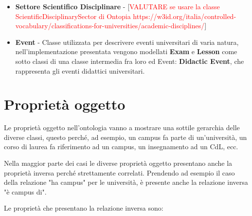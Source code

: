 \begin{itemize}
    \item \textbf{Settore Scientifico Disciplinare} - [\textcolor{red}{VALUTARE se usare la classe ScientificDisciplinarySector di Ontopia https://w3id.org/italia/controlled-vocabulary/classifications-for-universities/academic-disciplines/}]

    \item \textbf{Event} - Classe utilizzata per descrivere eventi universitari di varia natura, nell'implementazione presentata vengono modellati \textbf{Exam} e \textbf{Lesson} come sotto classi di una classe intermedia fra loro ed Event: \textbf{Didactic Event}, che rappresenta gli eventi didattici universitari.
    
\end{itemize}

\section{Proprietà oggetto}

Le proprietà oggetto nell'ontologia vanno a mostrare una sottile gerarchia delle diverse classi, questo perché, ad esempio, un campus fa parte di un'università, un corso di laurea fa riferimento ad un campus, un insegnamento ad un CdL, ecc.

Nella maggior parte dei casi le diverse proprietà oggetto presentano anche la proprietà inversa perché strettamente correlati. Prendendo ad esempio il caso della relazione "ha campus" per le università, è presente anche la relazione inversa "è campus di".

Le proprietà che presentano la relazione inversa sono:

